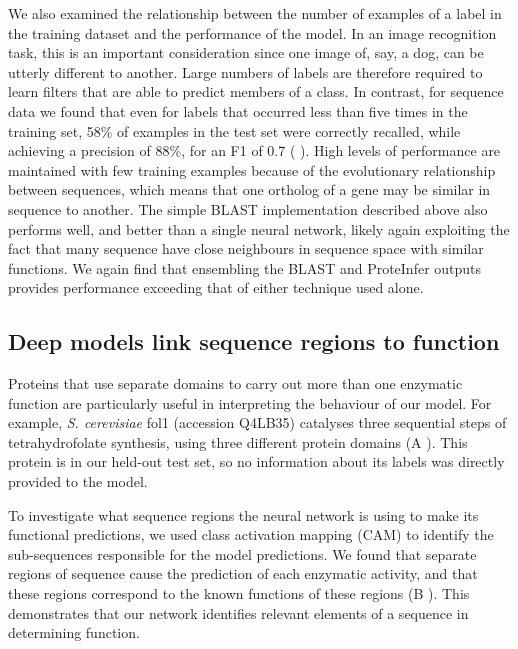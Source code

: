 We also examined the relationship between the number of examples of a label in the training dataset and the performance of the model. In an image recognition task, this is an important consideration since one image of, say, a dog, can be utterly different to another. Large numbers of labels are therefore required to learn filters that are able to predict members of a class. In contrast, for sequence data we found that even for labels that occurred less than five times in the training set, 58\% of examples in the test set were correctly recalled, while achieving a precision of 88\%, for an F1 of 0.7 (%
). High levels of performance are maintained with few training examples because of the evolutionary relationship between sequences, which means that one ortholog of a gene may be similar in sequence to another. The simple BLAST implementation described above also performs well, and better than a single neural network, likely again exploiting the fact that many sequence have close neighbours in sequence space with similar functions. We again find that ensembling the BLAST and ProteInfer outputs provides performance exceeding that of either technique used alone.

  
\subsection*{Deep models link sequence regions to function}
Proteins that use separate domains to carry out more than one enzymatic function are particularly useful in interpreting the behaviour of our model. For example, \textit{S. cerevisiae} fol1 (accession Q4LB35) catalyses three sequential steps of tetrahydrofolate synthesis, using three different protein domains (A%
). This protein is in our held-out test set, so no information about its labels was directly provided to the model.

To investigate what sequence regions the neural network is using to make its functional predictions, we used class activation mapping (CAM) \citep{classactivationmapping} to identify the sub-sequences responsible for the model predictions. We found that separate regions of sequence cause the prediction of each enzymatic activity, and that these regions correspond to the known functions of these regions (B%
).  This demonstrates that our network identifies relevant elements of a sequence in determining function. 

